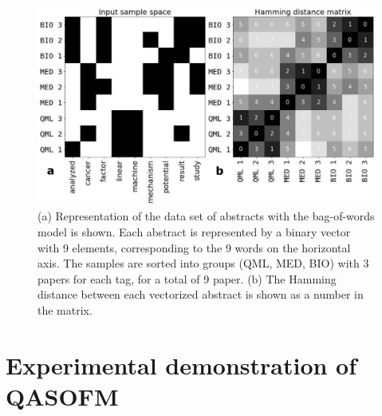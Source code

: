 \documentclass[pra,showkeys,twocolumn,showpacs]{revtex4-1}
\begin{document}
\begin{figure}[t]
	\includegraphics[width=0.95\columnwidth]{vectorized_sample.png}
	\caption{
		(a) Representation of the data set of abstracts with the bag-of-words \cite{weikang2016} model is shown. 
		Each abstract is represented by a binary vector with 9 elements, corresponding to the 9 words on the horizontal axis. 
		The samples are sorted into groups (QML, MED, BIO) with 3 papers for each tag, for a total of 9 paper.    
		(b) The Hamming distance between each vectorized abstract is shown as a number in the matrix. 
	} 
	\label{fig:vectorized_sample}
\end{figure}



















\section{Experimental demonstration of QASOFM}
\end{document}
